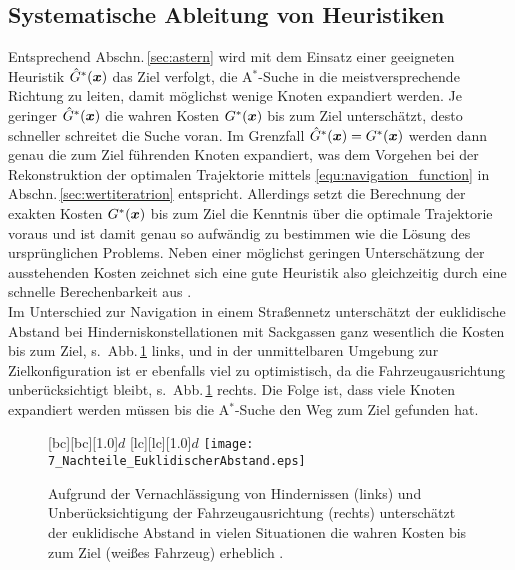 {\subsection{Systematische Ableitung von Heuristiken}
Entsprechend Abschn.\,\ref{sec:astern} wird mit dem Einsatz einer geeigneten Heuristik $\hat G^\ast(\boldsymbol{x})$ das Ziel verfolgt, die A$^\ast$-Suche in die meistversprechende Richtung zu leiten, damit möglichst wenige Knoten expandiert werden. Je geringer $\hat G^\ast(\boldsymbol{x})$ die wahren Kosten $G^\ast(\boldsymbol{x})$  bis zum Ziel unterschätzt, desto schneller schreitet die Suche voran. Im Grenzfall $\hat G^\ast(\boldsymbol{x}) = G^\ast(\boldsymbol{x})$ werden dann genau die zum Ziel führenden Knoten expandiert, was dem Vorgehen bei der Rekonstruktion der optimalen Trajektorie mittels \eqref{equ:navigation_function} in Abschn.\,\ref{sec:wertiteratrion} entspricht. Allerdings setzt die Berechnung der exakten Kosten $G^\ast(\boldsymbol{x})$ bis zum Ziel die Kenntnis über die optimale Trajektorie voraus und ist damit genau so aufwändig zu bestimmen wie die Lösung des ursprünglichen Problems. Neben einer möglichst geringen Unterschätzung der ausstehenden Kosten zeichnet sich eine gute Heuristik also gleichzeitig durch eine schnelle Berechenbarkeit aus \cite{lavalle2006pa}. \\
Im Unterschied zur Navigation in einem Straßennetz unterschätzt der euklidische Abstand bei Hinderniskonstellationen mit Sackgassen ganz wesentlich die Kosten bis zum Ziel, s.\ Abb.\,\ref{fig:badheuristic} links, und in der unmittelbaren Umgebung zur Zielkonfiguration ist er ebenfalls viel zu optimistisch, da die Fahrzeugausrichtung unberücksichtigt bleibt, s.\ Abb.\,\ref{fig:badheuristic} rechts. Die Folge ist, dass viele Knoten expandiert werden müssen bis die A$^\ast$-Suche den Weg zum Ziel gefunden hat.
\\
\begin{figure}[h]
\centering
{}[bc][bc][1.0]{$d$}
[lc][lc][1.0]{$d$}
 \texttt{[image: 7\_Nachteile\_EuklidischerAbstand.eps]}
	\caption[Nachteile des euklidischen Abstands als Heuristik]{Aufgrund der Vernachlässigung von Hindernissen (links) und Unberücksichtigung der Fahrzeugausrichtung (rechts) unterschätzt der euklidische Abstand in vielen Situationen die wahren Kosten bis zum Ziel (weißes Fahrzeug) erheblich \cite{likhachev2009planning}.}
	\label{fig:badheuristic}
\end{figure} 

}
